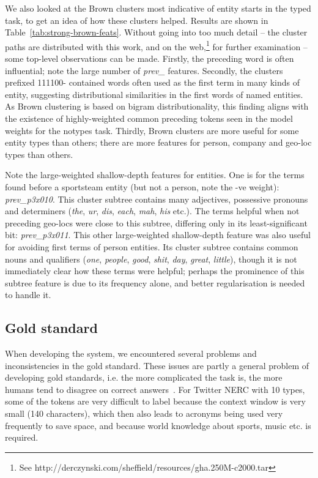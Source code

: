 \documentclass[11pt|a4paper]{article}
\begin{document}
\label{sec:brown}
We also looked at the Brown clusters most indicative of entity starts in the typed task, to get an idea of how these clusters helped.
Results are shown in Table~\ref{tab:strong-brown-feats}.
Without going into too much detail -- the cluster paths are distributed with this work, and on the web,\footnote{See {\small http://derczynski.com/sheffield/resources/gha.250M-c2000.tar}} for further examination -- some top-level observations can be made.
Firstly, the preceding word is often influential; note the large number of {\em prev\_\*} features.
Secondly, the clusters prefixed 111100- contained words often used as the first term in many kinds of entity, suggesting distributional similarities in the first words of named entities. 
As Brown clustering is based on bigram distributionality, this finding aligns with the existence of highly-weighted common preceding tokens seen in the model weights for the notypes task.
Thirdly, Brown clusters are more useful for some entity types than others; there are more features for person, company and geo-loc types than others.

Note the large-weighted shallow-depth features for entities.
One is for the terms found before a sportsteam entity (but not a person, note the -ve weight): {\em prev\_p3x010}.
This cluster subtree contains many adjectives, possessive pronouns and determiners ({\em the}, {\em ur}, {\em dis}, {\em each}, {\em mah}, {\em his} etc.).
The terms helpful when not preceding geo-locs were close to this subtree, differing only in its least-significant bit: {\em prev\_p3x011}.
This other large-weighted shallow-depth feature was also useful for avoiding first terms of person entities.
Its cluster subtree contains common nouns and qualifiers ({\em one}, {\em people}, {\em good}, {\em shit}, {\em day}, {\em great}, {\em little}), though it is not immediately clear how these terms were helpful; perhaps the prominence of this subtree feature is due to its frequency alone, and better regularisation is needed to handle it.


\subsection{Gold standard}
When developing the system, we encountered several problems and inconsistencies in the gold standard. These issues are partly a general problem of developing gold standards, i.e. the more complicated the task is, the more humans tend to disagree on correct answers~\cite{Tissot2015a}. For Twitter NERC with 10 types, some of the tokens are very difficult to label because the context window is very small (140 characters), which then also leads to acronyms being used very frequently to save space, and because world knowledge about sports, music etc. is required.
\end{document}
